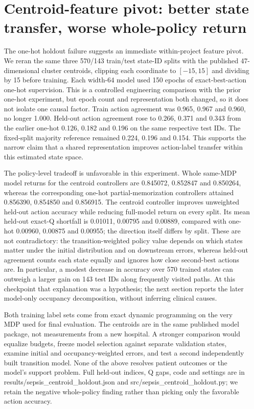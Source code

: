 \section{Centroid-feature pivot: better state transfer, worse whole-policy return}
The one-hot holdout failure suggests an immediate within-project feature pivot. We reran the same three 570/143 train/test state-ID splits with the published 47-dimensional cluster centroids, clipping each coordinate to $[-15,15]$ and dividing by 15 before training. Each width-64 model used 150 epochs of exact-best-action one-hot supervision. This is a controlled engineering comparison with the prior one-hot experiment, but epoch count and representation both changed, so it does not isolate one causal factor. Train action agreement was 0.965, 0.967 and 0.960, no longer 1.000. Held-out action agreement rose to 0.266, 0.371 and 0.343 from the earlier one-hot 0.126, 0.182 and 0.196 on the same respective test IDs. The fixed-split majority reference remained 0.224, 0.196 and 0.154. This supports the narrow claim that a shared representation improves action-label transfer within this estimated state space.

The policy-level tradeoff is unfavorable in this experiment. Whole same-MDP model returns for the centroid controllers are 0.845072, 0.852847 and 0.850264, whereas the corresponding one-hot partial-memorization controllers attained 0.856390, 0.854850 and 0.856915. The centroid controller improves unweighted held-out action accuracy while reducing full-model return on every split. Its mean held-out exact-Q shortfall is 0.01011, 0.00795 and 0.00889, compared with one-hot 0.00960, 0.00875 and 0.00955; the direction itself differs by split. These are not contradictory: the transition-weighted policy value depends on which states matter under the initial distribution and on downstream errors, whereas held-out agreement counts each state equally and ignores how close second-best actions are. In particular, a modest decrease in accuracy over 570 trained states can outweigh a larger gain on 143 test IDs along frequently visited paths. At this checkpoint that explanation was a hypothesis; the next section reports the later model-only occupancy decomposition, without inferring clinical causes.

Both training label sets come from exact dynamic programming on the very MDP used for final evaluation. The centroids are in the same published model package, not measurements from a new hospital. A stronger comparison would equalize budgets, freeze model selection against separate validation states, examine initial and occupancy-weighted errors, and test a second independently built transition model. None of the above resolves patient outcomes or the model's support problem. Full held-out indices, Q gaps, code and settings are in results/sepsis\_centroid\_holdout.json and src/sepsis\_centroid\_holdout.py; we retain the negative whole-policy finding rather than picking only the favorable action accuracy.

